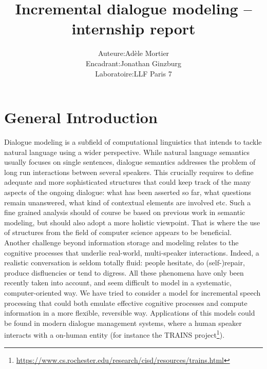 \documentclass[11pt]{article}
\begin{document}
	\title{Incremental dialogue modeling -- internship report}
	\author{\begin{tabular}{rcl}
			Auteure &:& Adèle Mortier \\
			Encadrant &:& Jonathan Ginzburg\\
			Laboratoire &:& LLF Paris 7
		\end{tabular}
	}
	\maketitle
	
	

	\section*{General Introduction}
		Dialogue modeling is a subfield of computational linguistics that intends to tackle natural language using a wider perspective. While natural language semantics usually focuses on single sentences, dialogue semantics addresses the problem of long run interactions between several speakers. This crucially requires to define adequate and more sophisticated structures that could keep track of the many aspects of the ongoing dialogue: what has been asserted so far, what questions remain unanswered, what kind of contextual elements are involved etc. Such a fine grained analysis should of course be based on previous work in semantic modeling, but should also adopt a more holistic viewpoint. That is where the use of structures from the field of computer science appears to be beneficial.\\
		
		Another challenge beyond information storage and modeling relates to the cognitive processes that underlie real-world, multi-speaker interactions. Indeed, a realistic conversation is seldom totally fluid: people hesitate, do (self-)repair, produce disfluencies or tend to digress. All these phenomena have only been recently taken into account, and seem difficult to model in a systematic, computer-oriented way. We have tried to consider a model for incremental speech processing that could both emulate effective cognitive processes and compute information in a more flexible, reversible way. Applications of this models could be found in modern dialogue management systems, where a human speaker interacts with a on-human entity (for instance the TRAINS project\footnote{\href{https://www.cs.rochester.edu/research/cisd/resources/trains.html}{https://www.cs.rochester.edu/research/cisd/resources/trains.html}}).
		
\end{document}
